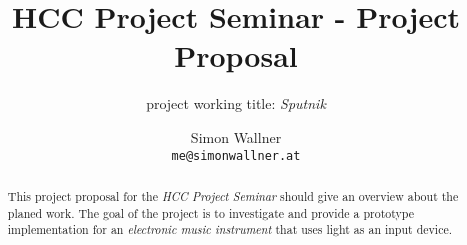 \documentclass[10pt,a4paper]{scrartcl}
\author{Simon Wallner\\\texttt{me@simonwallner.at}}
\title{HCC Project Seminar - Project Proposal}
\subtitle{project working title: \emph{Sputnik}}
\begin{document}
\maketitle

\begin{abstract}
This project proposal for the \emph{HCC Project Seminar} should give an overview about the planed work. The goal of the project is to investigate and provide a prototype implementation for an \emph{electronic music instrument} that uses light as an input device.
\end{abstract}
\end{document}
